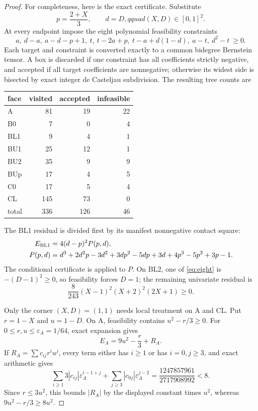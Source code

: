 \documentclass[11pt]{article}
\begin{document}
\begin{proof}
For completeness, here is the exact certificate.  Substitute
\[
 p=\frac{2+X}{3},\qquad d=D,qquad (X,D)\in[0,1]^2.
\]
At every endpoint impose the eight polynomial feasibility constraints
\begin{equation}
 a,\ d-a,\ a-d-p+1,\ t,\ t-2a+p,\
 t-a+d(1-d),\ a-t,\ d^2-t\ \geq0.
 \label{eq:eight}
\end{equation}
Each target and constraint is converted exactly to a common bidegree
Bernstein tensor.  A box is discarded if one constraint has all coefficients
strictly negative, and accepted if all target coefficients are nonnegative;
otherwise its widest side is bisected by exact integer de Casteljau
subdivision.  The resulting tree counts are
\begin{center}
\begin{tabular}{lrrr}
\toprule
face & visited & accepted & infeasible\\
\midrule
A&81&19&22\\
B0&7&0&4\\
BL1&9&4&1\\
BU1&25&12&1\\
BU2&35&9&9\\
BUp&17&4&5\\
C0&17&5&4\\
CL&145&73&0\\
\midrule
total&336&126&46\\
\bottomrule
\end{tabular}
\end{center}
The BL1 residual is divided first by its manifest nonnegative contact square:
\begin{align}
 E_{\mathrm{BL1}}
 &=4(d-p)^2P(p,d),\notag\\
 P(p,d)&=d^3+2d^2p-3d^2+3dp^2-5dp+3d
 +4p^3-5p^2+3p-1.
 \label{eq:BL1}
\end{align}
The conditional certificate is applied to $P$.  On BL2, one of
\eqref{eq:eight} is $-(D-1)^2\geq0$, so feasibility forces $D=1$; the
remaining univariate residual is
\begin{equation}
 \frac8{243}(X-1)^2(X+2)^2(2X+1)\geq0.
 \label{eq:BL2}
\end{equation}

Only the corner $(X,D)=(1,1)$ needs local treatment on A and CL.  Put
$r=1-X$ and $u=1-D$.  On A, feasibility contains
$u^2-r/3\geq0$.  For $0\leq r,u\leq\varepsilon_A=1/64$, exact expansion gives
\[
 E_A=9u^2-\frac r3+R_A.
\]
If $R_A=\sum c_{ij}r^iu^j$, every term either has $i\geq1$ or has
$i=0,j\geq3$, and exact arithmetic gives
\begin{equation}
 \sum_{i\geq1}3|c_{ij}|\varepsilon_A^{i-1+j}
 +\sum_{j\geq3}|c_{0j}|\varepsilon_A^{j-2}
 =\frac{1247857961}{2717908992}<8.
 \label{eq:A-loss}
\end{equation}
Since $r\leq3u^2$, this bounds $|R_A|$ by the displayed constant times
$u^2$, whereas $9u^2-r/3\geq8u^2$.


\end{proof}
\end{document}
